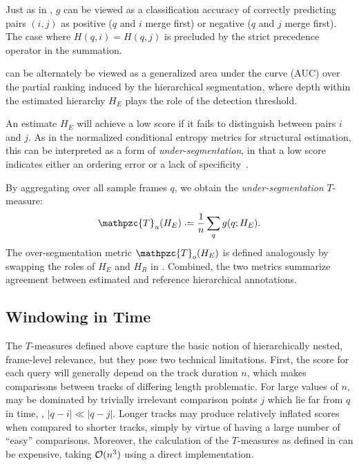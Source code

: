 \documentclass{article}
\def\shag{\ensuremath{\mathpzc{T}}}
\begin{document}
Just as in , $g$ can be viewed as a classification accuracy of correctly predicting pairs $(i, j)$ as positive ($q$ and $i$ merge first) or negative ($q$ and $j$ merge first).
The case where $H(q, i) = H(q, j)$ is precluded by the strict precedence operator in the summation.

 can be alternately be viewed as a generalized area under the curve (AUC) over the partial
ranking induced by the hierarchical segmentation, where depth within the estimated hierarchy $H_E$ plays the
role of the detection threshold.

An estimate $H_E$ will achieve a low score if it fails to distinguish between pairs $i$ and $j$.
As in the normalized conditional entropy metrics for structural estimation, this can be interpreted as a form of \emph{under-segmentation}, in that a low score indicates either an ordering error or a lack of specificity~\cite{Lukashevich2008}.  

By aggregating over all sample frames $q$, we obtain the \emph{under-segmentation} $T$-measure:
\begin{equation}
\shag_u(H_E) \defeq \frac{1}{n} \sum_q g(q ; H_E).\label{shagunder}
\end{equation}
The over-segmentation metric $\shag_o(H_E)$ is defined analogously by swapping the roles of $H_E$ and $H_R$ in .
Combined, the two metrics summarize agreement between estimated and reference hierarchical annotations.


\subsection{Windowing in Time}
\label{sec:window}

The $T$-measures defined above capture the basic notion of hierarchically nested, frame-level relevance, but they pose two technical limitations.
First, the score for each query will generally depend on the track duration $n$, which makes comparisons between tracks of differing length problematic.  
For large values of $n$,  may be dominated by trivially irrelevant comparison points $j$ which lie far from $q$ in time, \ie, $|q-i| \ll |q-j|$.
Longer tracks may produce relatively inflated scores when compared to shorter tracks, simply by virtue of having a large number of ``easy'' comparisons.
Moreover, the calculation of the $T$-measures as defined in  can be expensive, taking $\mathcal{O}(n^3)$ using a direct implementation.
\end{document}
